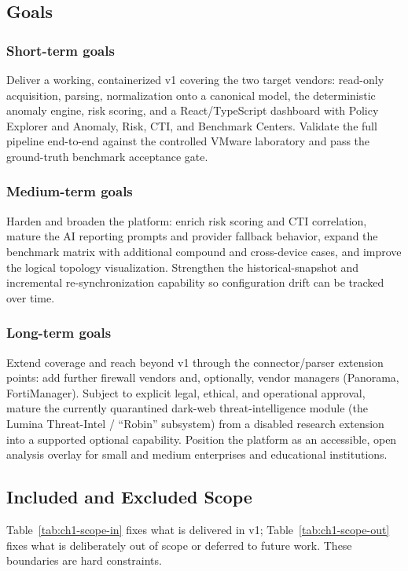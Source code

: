 \documentclass[12pt,a4paper]{report}
\renewcommand{\_}{\textunderscore\allowbreak}
\begin{document}
\subsection{Goals}
\label{sec:ch1-goals}

\subsubsection{Short-term goals}
Deliver a working, containerized v1 covering the two target vendors: read-only acquisition, parsing, normalization onto a canonical model, the deterministic anomaly engine, risk scoring, and a React/TypeScript dashboard with Policy Explorer and Anomaly, Risk, CTI, and Benchmark Centers. Validate the full pipeline end-to-end against the controlled VMware laboratory and pass the ground-truth benchmark acceptance gate.

\subsubsection{Medium-term goals}
Harden and broaden the platform: enrich risk scoring and CTI correlation, mature the AI reporting prompts and provider fallback behavior, expand the benchmark matrix with additional compound and cross-device cases, and improve the logical topology visualization. Strengthen the historical-snapshot and incremental re-synchronization capability so configuration drift can be tracked over time.

\subsubsection{Long-term goals}
Extend coverage and reach beyond v1 through the connector/parser extension points: add further firewall vendors and, optionally, vendor managers (Panorama, FortiManager). Subject to explicit legal, ethical, and operational approval, mature the currently quarantined dark-web threat-intelligence module (the Lumina Threat-Intel / ``Robin'' subsystem) from a disabled research extension into a supported optional capability. Position the platform as an accessible, open analysis overlay for small and medium enterprises and educational institutions.

\subsection{Included and Excluded Scope}
\label{sec:ch1-inout}

Table~\ref{tab:ch1-scope-in} fixes what is delivered in v1; Table~\ref{tab:ch1-scope-out} fixes what is deliberately out of scope or deferred to future work. These boundaries are hard constraints.
\end{document}
